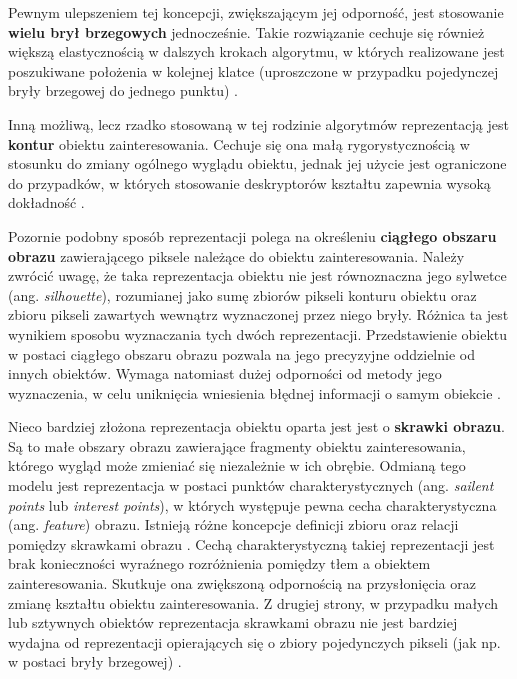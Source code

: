 Pewnym ulepszeniem tej koncepcji, zwiększającym jej odporność, jest stosowanie \textbf{wielu brył brzegowych} jednocześnie. Takie rozwiązanie cechuje się również większą elastycznością w dalszych krokach algorytmu, w których realizowane jest poszukiwane położenia w kolejnej klatce (uproszczone w przypadku pojedynczej bryły brzegowej do jednego punktu) \cite{Smeulders2010}.

Inną możliwą, lecz rzadko stosowaną w tej rodzinie algorytmów reprezentacją jest \textbf{kontur} obiektu zainteresowania. Cechuje się ona małą rygorystycznością w stosunku do zmiany ogólnego wyglądu obiektu, jednak jej użycie jest ograniczone do przypadków, w których stosowanie deskryptorów kształtu zapewnia wysoką dokładność \cite{Smeulders2010}.

Pozornie podobny sposób reprezentacji polega na określeniu \textbf{ciągłego obszaru obrazu} zawierającego piksele należące do obiektu zainteresowania. Należy zwrócić uwagę, że taka reprezentacja obiektu nie jest równoznaczna jego sylwetce (ang. \textit{silhouette}), rozumianej jako sumę zbiorów pikseli konturu obiektu oraz zbioru pikseli zawartych wewnątrz wyznaczonej przez niego bryły. Różnica ta jest wynikiem sposobu wyznaczania tych dwóch reprezentacji. Przedstawienie obiektu w postaci ciągłego obszaru obrazu pozwala na jego precyzyjne oddzielnie od innych obiektów. Wymaga natomiast dużej odporności od metody jego wyznaczenia, w celu uniknięcia wniesienia błędnej informacji o samym obiekcie \cite{Smeulders2010}.  

Nieco bardziej złożona reprezentacja obiektu oparta jest jest o \textbf{skrawki obrazu}. Są to małe obszary obrazu zawierające fragmenty obiektu zainteresowania, którego wygląd może zmieniać się niezależnie w ich obrębie. Odmianą tego modelu jest reprezentacja w postaci punktów charakterystycznych (ang. \textit{sailent points} lub \textit{interest points}), w których występuje pewna cecha charakterystyczna (ang. \textit{feature}) obrazu. Istnieją różne koncepcje definicji zbioru oraz relacji pomiędzy skrawkami obrazu \cite{Smeulders2010}. Cechą charakterystyczną takiej reprezentacji jest brak konieczności wyraźnego rozróżnienia pomiędzy tłem a obiektem zainteresowania. Skutkuje ona zwiększoną odpornością na przysłonięcia oraz zmianę kształtu obiektu zainteresowania. Z drugiej strony, w przypadku małych lub sztywnych obiektów reprezentacja skrawkami obrazu nie jest bardziej wydajna od reprezentacji opierających się o zbiory pojedynczych pikseli (jak np. w postaci bryły brzegowej) \cite{Smeulders2010}.


